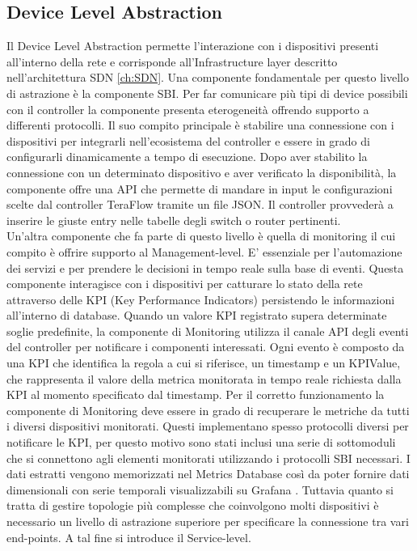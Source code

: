 \subsection{Device Level Abstraction}
Il Device Level Abstraction permette l'interazione con i dispositivi presenti all'interno della rete e corrisponde all'Infrastructure layer descritto nell'architettura SDN \ref{ch:SDN}.
Una componente fondamentale per questo livello di astrazione è la componente SBI.
Per far comunicare più tipi di device possibili con il controller la componente presenta eterogeneità offrendo supporto a differenti protocolli.
Il suo compito principale è stabilire una connessione con i dispositivi per integrarli nell'ecosistema del controller
e essere in grado di configurarli dinamicamente a tempo di esecuzione. 
Dopo aver stabilito la connessione con un determinato dispositivo e aver verificato la disponibilità,
la componente offre una API che permette di mandare in input le configurazioni scelte dal controller TeraFlow tramite un file JSON. 
Il controller provvederà a inserire le giuste entry nelle tabelle degli switch o router pertinenti.
\\Un'altra componente che fa parte di questo livello è quella di monitoring il cui compito è offrire supporto al Management-level.
E' essenziale per l'automazione dei servizi e per prendere le decisioni in tempo reale sulla base di eventi.
Questa componente interagisce con i dispositivi per catturare lo stato della rete attraverso delle KPI (Key Performance Indicators) persistendo le informazioni all'interno di database. %
Quando un valore KPI registrato supera determinate soglie predefinite, la componente di Monitoring utilizza il canale API degli eventi del controller per notificare i componenti interessati.
Ogni evento è composto da una KPI che identifica la regola a cui si riferisce, un timestamp e un KPIValue, che rappresenta il valore della metrica monitorata in tempo reale richiesta dalla KPI al momento specificato dal timestamp.
Per il corretto funzionamento la componente di Monitoring deve essere in grado di recuperare le metriche da tutti i diversi dispositivi monitorati.
Questi implementano spesso protocolli diversi per notificare le KPI, per questo motivo sono stati inclusi una serie di sottomoduli che si connettono 
agli elementi monitorati utilizzando i protocolli SBI necessari. I dati estratti vengono memorizzati nel Metrics Database così da poter fornire dati dimensionali 
con serie temporali visualizzabili su Grafana \cite{grafana}.
Tuttavia quanto si tratta di gestire topologie più complesse che coinvolgono molti dispositivi è necessario un livello di astrazione superiore per specificare la connessione tra vari end-points. A tal fine si introduce il Service-level. 

